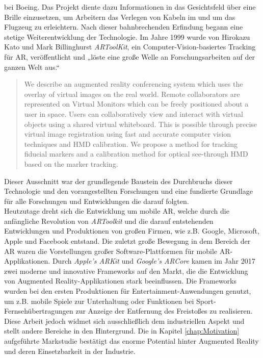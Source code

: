 bei Boeing. Das Projekt diente dazu Informationen in das Gesichtsfeld über eine Brille einzusetzen, um Arbeitern das Verlegen von Kabeln im und um das 
Flugzeug zu erleichtern. Nach dieser bahnbrechenden Erfindung begann eine stetige Weiterentwicklung der Technologie. Im Jahre 1999 wurde 
von Hirokazu Kato und Mark Billinghurst \textit{ARToolKit}, ein Computer-Vision-basiertes Tracking für AR, veröffentlicht und „löste eine 
große Welle an Forschungsarbeiten auf der ganzen Welt aus.“ \cite{springer.2019s} 
\begin{quote}
    We describe an augmented reality conferencing system which uses the overlay of virtual images on the real world. Remote collaborators 
    are represented on Virtual Monitors which can be freely positioned about a user in space. Users can collaboratively view and interact 
    with virtual objects using a shared virtual whiteboard. This is possible through precise virtual image registration using fast and 
    accurate computer vision techniques and HMD calibration. We propose a method for tracking fiducial markers and a calibration method 
    for optical see-through HMD based on the marker tracking. \cite{artoolkitsheet.1999o}
\end{quote}
Dieser Ausschnitt war der grundlegende Baustein des Durchbruchs dieser Technologie und den vorangestellten Forschungen und eine fundierte 
Grundlage für alle Forschungen und Entwicklungen die darauf folgten. 
\\ 
Heutzutage dreht sich die Entwicklung um mobile AR, welche durch die anfängliche Revolution von \textit{ARToolkit} und die darauf entstehenden 
Entwicklungen und Produktionen von großen Firmen, wie z.B. Google, Microsoft, Apple und Facebook entstand. Die zuletzt große Bewegung in dem 
Bereich der AR waren die Vorstellungen großer Software-Plattformen für mobile AR-Applikationen. Durch \textit{Apple's ARKit} und \textit{Google's ARCore} 
kamen im Jahr 2017 zwei moderne und innovative Frameworks auf den Markt, die die Entwicklung von Augmented Reality-Applikationen stark beeinflussen.
Die Frameworks wurden bei den ersten Produktionen für Entertainment-Anwendungen genutzt, um z.B. mobile Spiele zur Unterhaltung oder 
Funktionen bei Sport-Fernsehübertragungen zur Anzeige der Entfernung des Freistoßes zu realisieren.
\\ 
\linebreak
Diese Arbeit jedoch widmet sich ausschließlich dem industriellen Aspekt und stellt andere Bereiche in den Hintergrund. Die in Kapitel 
\ref{chap:Motivation} aufgeführte Markstudie bestätigt das enorme Potential hinter Augmented Reality und deren Einsetzbarkeit in der Industrie.
